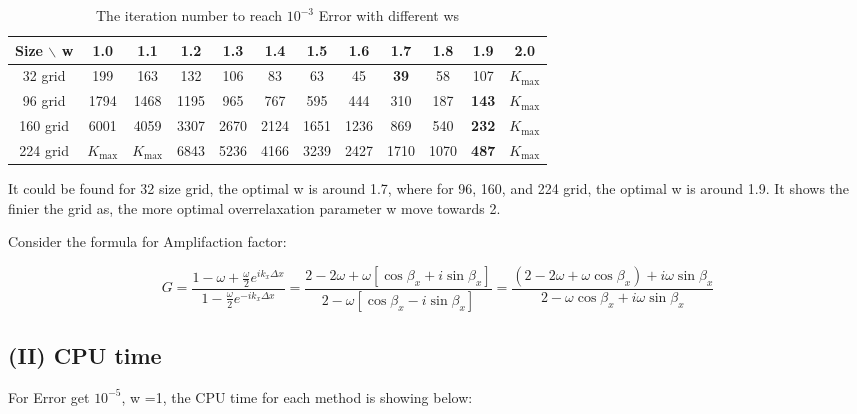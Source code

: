 \documentclass[12pt]{article}
\begin{document}
\begin{table}[ht]
    \centering
    \begin{tabular}{cccccccccccc}
    \toprule
    Size $\backslash$ w & 1.0 & 1.1 & 1.2 & 1.3 & 1.4 & 1.5 & 1.6 & 1.7 & 1.8 & 1.9 & 2.0 \\
    \midrule
    32 grid & 199 & 163 & 132 & 106 & 83 & 63 & 45 & \textbf{39} & 58 & 107 &\( K_{\text{max}} \) \\
    96 grid & 1794 & 1468 & 1195 & 965 & 767 & 595 & 444 & 310 & 187 & \textbf{143} & \( K_{\text{max}} \) \\
    160 grid & 6001 & 4059 & 3307 & 2670 & 2124 & 1651 & 1236 & 869 & 540 & \textbf{232} & \( K_{\text{max}} \) \\
    224 grid & \( K_{\text{max}} \) & \( K_{\text{max}} \) &  6843 & 5236 & 4166 & 3239 & 2427 & 1710 & 1070 & \textbf{487} & \( K_{\text{max}} \) \\
    \bottomrule
    \end{tabular}
    \caption{The iteration number to reach $10^{-3}$ Error with different ws}
    \label{tab:my_label}
\end{table}
    
    It could be found for 32 size grid, the optimal w is around 1.7, where for 
    96, 160, and 224 grid, the optimal w is around 1.9. It shows the finier the grid as,
    the more optimal overrelaxation parameter w move towards 2.


Consider the formula for Amplifaction factor:

\begin{equation}
G = \frac{1 - \omega + \frac{\omega}{2} e^{i k_x \Delta x}}
         {1 - \frac{\omega}{2} e^{-i k_x \Delta x}}
  = \frac{2 - 2\omega + \omega[\cos \beta_x + i \sin \beta_x]}
         {2 - \omega[\cos \beta_x - i \sin \beta_x]}
  = \frac{(2 - 2\omega + \omega \cos \beta_x) + i\omega \sin \beta_x}
         {2 - \omega \cos \beta_x + i\omega \sin \beta_x}
\end{equation}









\subsection{(II) CPU time}


For Error get $10^{-5}$, w =1, the CPU time for each method is showing below:
\end{document}
